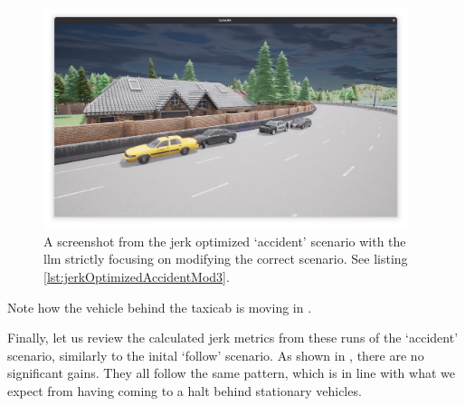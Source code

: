 \begin{figure}[htb]
    \centering
    \includegraphics[width=0.95\textwidth]{experiment-material/accident-pics/mod-3/freecam.png}
    \caption{A screenshot from the jerk optimized `accident' scenario with the \acrshort{llm}
        strictly focusing on modifying the correct scenario. See listing
        \ref{lst:jerkOptimizedAccidentMod3}.}\label{fig:accidentMod3FinalFreecam}
\end{figure}

Note how the vehicle behind the taxicab is moving in .

Finally, let us review the calculated jerk metrics from these runs of the `accident' scenario,
similarly to the inital `follow' scenario. As shown in , there are
no significant gains. They all follow the same pattern, which is in line with what we expect from
having
coming to a halt behind stationary vehicles.

